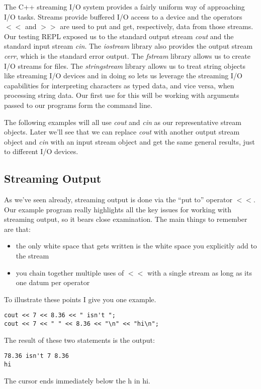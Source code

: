 \documentclass[]{tufte-handout}
\begin{document}
The C++ streaming I/O system provides a fairly uniform way of approaching I/O tasks. Streams provide buffered I/O access to a device and the operators $<<$ and $>>$ are used to put and get, respectively, data from those streams. Our testing REPL exposed us to the standard output stream \textit{cout} and the standard input stream \textit{cin}. The \textit{iostream} library also provides the output stream \textit{cerr}, which is the standard error output. The \textit{fstream} library allows us to create I/O streams for files. The \textit{stringstream} library allows us to treat string objects like streaming I/O devices and in doing so lets us leverage the streaming I/O capabilities for interpreting characters as typed data, and vice versa, when processing string data. Our first use for this will be working with arguments passed to our programs form the command line.

The following examples will all use \textit{cout} and \textit{cin} as our representative stream objects. Later we'll see that we can replace \textit{cout} with another output stream object and \textit{cin} with an input stream object and get the same general results, just to different I/O devices.

\subsection{Streaming Output}

As we've seen already, streaming output is done via the ``put to'' operator \textit{$<<$}. Our example program really highlights all the key issues for working with streaming output, so it bears close examination. The main things to remember are that:
\begin{itemize}
\item the only white space that gets written is the white space you explicitly add to the stream
\item you chain together multiple uses of $<<$ with a single stream as long as its one datum per operator
\end{itemize}
To illustrate these points I give you one example.
\begin{verbatim}
cout << 7 << 8.36 << " isn't ";
cout << 7 << " " << 8.36 << "\n" << "hi\n";
\end{verbatim}
The result of these two statements is the output:
\begin{verbatim}
78.36 isn't 7 8.36
hi

\end{verbatim}
The cursor ends immediately below the h in hi.
\end{document}
